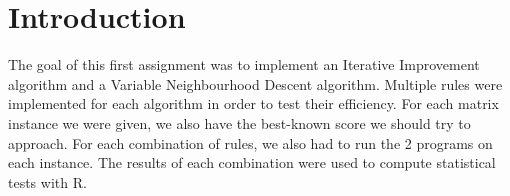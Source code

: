 \section{Introduction}

The goal of this first assignment was to implement an Iterative Improvement
algorithm and a Variable Neighbourhood Descent algorithm. Multiple rules were
implemented for each algorithm in order to test their efficiency. For each
matrix instance we were given, we also have the best-known score we should try
to approach. For each combination of rules, we also had to run the 2 programs
on each instance. The results of each combination were used to compute
statistical tests with R.
